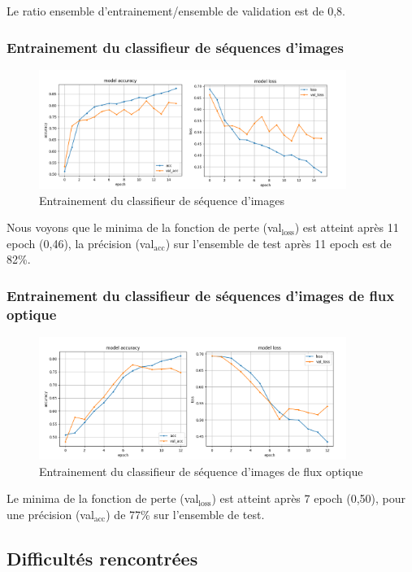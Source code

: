 \documentclass[11pt]{article}
\begin{document}
Le ratio ensemble d'entrainement/ensemble de validation est de 0,8.\\

\subsubsection{Entrainement du classifieur de séquences d'images}
\label{sec:orgda9919d}
\begin{figure}[htbp]
\centering
\includegraphics[width=10cm]{conv_train.png}
\caption{Entrainement du classifieur de séquence d'images}
\end{figure}
Nous voyons que le minima de la fonction de perte (val\(_{\text{loss}}\)) est atteint après 11 epoch (0,46), la précision (val\(_{\text{acc}}\)) sur l'ensemble de test après 11 epoch est de 82\%.\\
\subsubsection{Entrainement du classifieur de séquences d'images de flux optique}
\label{sec:orgb776a49}
\begin{figure}[htbp]
\centering
\includegraphics[width=10cm]{flow_train.png}
\caption{Entrainement du classifieur de séquence d'images de flux optique}
\end{figure}
Le minima de la fonction de perte (val\(_{\text{loss}}\)) est atteint après 7 epoch (0,50), pour une précision (val\(_{\text{acc}}\)) de 77\% sur l'ensemble de test.\\

\subsection{Difficultés rencontrées}
\label{sec:org26a5a60}
\end{document}

